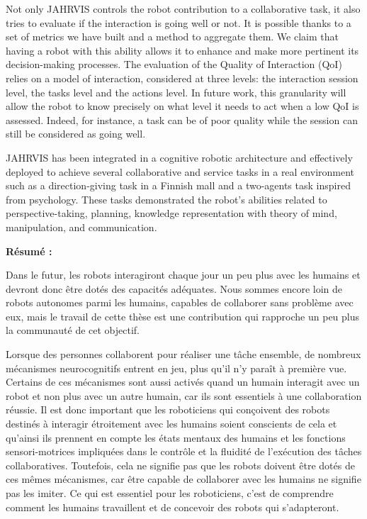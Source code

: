 \documentclass[english,a4paper,11pt,twoside]{StyleThese}
\begin{document}
\begin{vcenterpage}
Not only JAHRVIS controls the robot contribution to a collaborative task, it also tries to evaluate if the interaction is going well or not. It is possible thanks to a set of metrics we have built and a method to aggregate them. We claim that having a robot with this ability allows it to enhance and make more pertinent its decision-making processes. The evaluation of the Quality of Interaction (QoI) relies on a model of interaction, considered at  three levels: the interaction session level, the tasks level and the actions level. In future work, this granularity will allow the robot to know precisely on what level it needs to act when a low QoI is assessed. Indeed, for instance, a task can be of poor quality while the session can still be considered as going well.


JAHRVIS has been integrated in a cognitive robotic architecture and effectively deployed to achieve several collaborative and service tasks in a real environment such as a direction-giving task in a Finnish mall and a two-agents task inspired from psychology. These tasks demonstrated the robot’s abilities related to perspective-taking, planning, knowledge representation with theory of mind, manipulation, and communication.


\textbf{Résumé :}

Dans le futur, les robots interagiront chaque jour un peu plus avec les humains et devront donc être dotés des capacités adéquates. Nous sommes encore loin de robots autonomes parmi les humains, capables de collaborer sans problème avec eux, mais le travail de cette thèse est une contribution qui rapproche un peu plus la communauté de cet objectif. 


Lorsque des personnes collaborent pour réaliser une tâche ensemble, de nombreux mécanismes neurocognitifs entrent en jeu, plus qu’il n’y paraît à première vue. Certains de ces mécanismes sont aussi activés quand un humain interagit avec un robot et non plus avec un autre humain, car ils sont essentiels à une collaboration réussie. Il est donc important que les roboticiens qui conçoivent des robots destinés à interagir étroitement avec les humains soient conscients de cela et qu’ainsi ils prennent en compte les états mentaux des humains et les fonctions sensori-motrices impliquées dans le contrôle et la fluidité de l'exécution des tâches collaboratives. Toutefois, cela ne signifie pas que les robots doivent être dotés de ces mêmes mécanismes, car être capable de collaborer avec les humains ne signifie pas les imiter. Ce qui est essentiel pour les roboticiens, c'est de comprendre comment les humains travaillent et de concevoir des robots qui s'adapteront. 



\end{vcenterpage}
\end{document}
